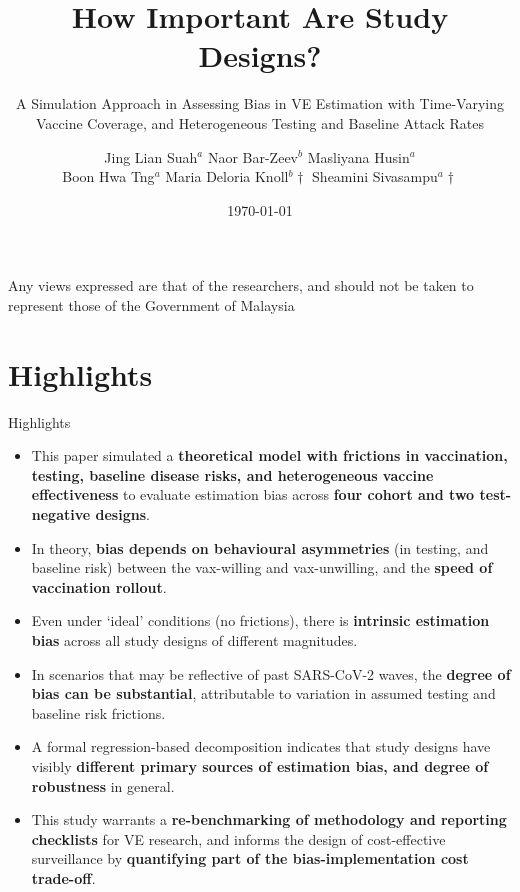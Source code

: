\documentclass[aspectratio=169]{beamer}
\title[Bias in VE Estimation]{How Important Are Study Designs?}
\subtitle{A Simulation Approach in Assessing Bias in VE Estimation with Time-Varying Vaccine Coverage, and Heterogeneous Testing and Baseline Attack Rates}
\author{Jing Lian Suah${}^a$ \qquad Naor Bar-Zeev${}^b$ \qquad Masliyana Husin${}^a$ \\ Boon Hwa Tng${}^a$ \qquad Maria Deloria Knoll${}^b\dagger$ \qquad Sheamini Sivasampu${}^a\dagger$}
\institute[ICR \& JHU]{${}^a$Institute for Clinical Research, National Institutes of Health, Malaysia \\ ${}^b$Bloomberg School of Public Health, John Hopkins University \\ $\dagger$ Co-Senior Authors}
\date{\today}
\begin{document}
	
\begin{frame}
	\titlepage
	\begin{center}
		\tiny
		Any views expressed are that of the researchers, and should not be taken to represent those of the Government of Malaysia
	\end{center}
\end{frame}	

\section{Highlights}
\begin{frame}{Highlights}
	\small
	\begin{itemize}
		\item This paper simulated a \textbf{theoretical model with frictions in vaccination, testing, baseline disease risks, and heterogeneous vaccine effectiveness} to evaluate estimation bias across \textbf{four cohort and two test-negative designs}.
		\item In theory, \textbf{bias depends on behavioural asymmetries} (in testing, and baseline risk) between the vax-willing and vax-unwilling, and the \textbf{speed of vaccination rollout}.
		\item Even under `ideal' conditions (no frictions), there is \textbf{intrinsic estimation bias} across all study designs of different magnitudes.
		\item In scenarios that may be reflective of past SARS-CoV-2 waves, the \textbf{degree of bias can be substantial}, attributable to variation in assumed testing and baseline risk frictions. 
		\item A formal regression-based decomposition indicates that study designs have visibly \textbf{different primary sources of estimation bias, and degree of robustness} in general.
		\item This study warrants a \textbf{re-benchmarking of methodology and reporting checklists} for VE research, and informs the design of cost-effective surveillance by \textbf{quantifying part of the bias-implementation cost trade-off}.
	\end{itemize}
\end{frame}
\end{document}
